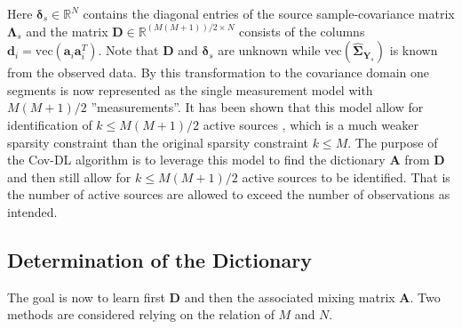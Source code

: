 Here $\boldsymbol{\delta}_s \in \mathbb{R}^{N}$ contains the diagonal entries of the source sample-covariance matrix $\boldsymbol{\Lambda}_s$
and the matrix $\mathbf{D} \in \mathbb{R}^{(M(M+1))/2 \times N}$ consists of the columns $\mathbf{d}_i = \text{vec}(\mathbf{a}_i \mathbf{a}_i^T)$. Note that $\mathbf{D}$ and $\boldsymbol{\delta}_s$ are unknown while $\text{vec}(\widehat{\boldsymbol{\Sigma}}_{\mathbf{Y}_s})$ is known from the observed data.
By this transformation to the covariance domain one segments is now represented as the single measurement model with $M(M+1)/2$ ''measurements''. It has been shown that this model allow for identification of $k\leq M(M+1)/2$ active sources \cite{Pal2015}, which is a much weaker sparsity constraint than the original sparsity constraint $k\leq M$. 
The purpose of the Cov-DL algorithm is to leverage this model to find the dictionary $\textbf{A}$ from $\textbf{D}$ and then still allow for $k\leq M(M+1)/2$ active sources to be identified. That is the number of active sources are allowed to exceed the number of observations as intended.

\subsection{Determination of the Dictionary}
The goal is now to learn first $\textbf{D}$ and then the associated mixing matrix $\textbf{A}$. Two methods are considered relying on the relation of $M$ and $N$.   

